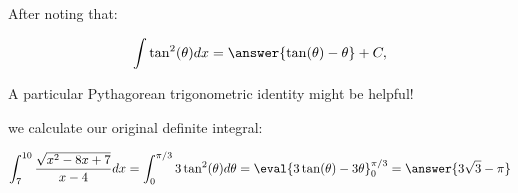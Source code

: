 \documentclass{ximera}
\begin{document}
\begin{exercise}
\begin{exercise}
\begin{exercise}
\begin{hint}
\end{hint}

After noting that:

\[
\int \tan^2(\theta) dx = \answer{\tan(\theta)-\theta}+C,
\]

\begin{hint}
A particular Pythagorean trigonometric identity might be helpful!
\end{hint}

we calculate our original definite integral: 

\[
\int_{7}^{10} \frac{\sqrt{x^{2}-8x+7}}{x-4} dx=\int_{0}^{\pi/3} 3\tan^{2}(\theta) d\theta= \eval{3\tan(\theta)-3\theta}_0^{\pi/3} = \answer{3\sqrt{3}-\pi}
\]


\end{exercise}
\end{exercise}
\end{exercise}
\end{document}
